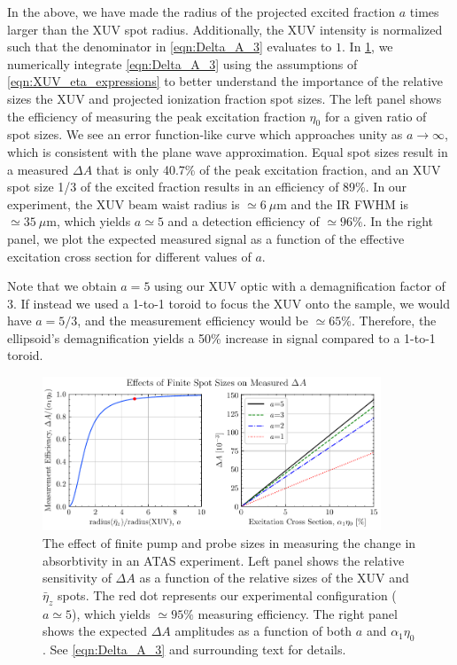 In the above, we have made the radius of the projected excited fraction $a$ times larger than the XUV spot radius. Additionally, the XUV intensity is normalized such that the denominator in \cref{eqn:Delta_A_3} evaluates to $1$. In \cref{fig:Delta_A_curve}, we numerically integrate \cref{eqn:Delta_A_3} using the assumptions of \cref{eqn:XUV_eta_expressions} to better understand the importance of the relative sizes the XUV and projected ionization fraction spot sizes. The left panel shows the efficiency of measuring the peak excitation fraction $\eta_0$ for a given ratio of spot sizes. We see an error function-like curve which approaches unity as $a \rightarrow \infty$, which is consistent with the plane wave approximation. Equal spot sizes result in a measured $\Delta A$ that is only 40.7\% of the peak excitation fraction, and an XUV spot size 1/3 of the excited fraction results in an efficiency of 89\%. In our experiment, the XUV beam waist radius is $\simeq 6 \ \mu \textrm{m}$ and the IR FWHM is $\simeq 35 \ \mu \textrm{m}$, which yields $a \simeq 5$ and a detection efficiency of $\simeq 96\%$. In the right panel, we plot the expected measured signal as a function of the effective excitation cross section for different values of $a$.

Note that we obtain $a=5$ using our XUV optic with a demagnification factor of 3. If instead we used a 1-to-1 toroid to focus the XUV onto the sample, we would have $a=5/3$, and the measurement efficiency would be $\simeq 65\%$. Therefore, the ellipsoid's demagnification yields a 50\% increase in signal compared to a 1-to-1 toroid.

\begin{figure}
	\centering
	\includegraphics[width=0.9\textwidth]{figures/chap4/Delta_A_curves.pdf}
	\caption{The effect of finite pump and probe sizes in measuring the change in absorbtivity in an ATAS experiment. Left panel shows the relative sensitivity of $\Delta A$ as a function of the relative sizes of the XUV and $\bar{\eta}_z$ spots. The red dot represents our experimental configuration ($a\simeq 5$), which yields $\simeq 95\%$ measuring efficiency. The right panel shows the expected $\Delta A$ amplitudes as a function of both $a$ and $\alpha_1 \eta_0$. See \cref{eqn:Delta_A_3} and surrounding text for details.}
	\label{fig:Delta_A_curve}
\end{figure}


